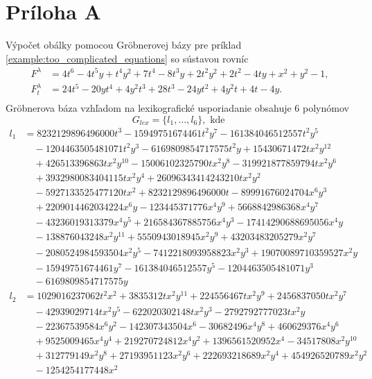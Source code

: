 \chapter{Príloha A}
\label{pri:priloha1}
Výpočet obálky pomocou Gröbnerovej bázy pre príklad \ref{example:too_complicated_equations} so sústavou rovníc
\begin{align*}
F^\lambda &= 4 t^6 - 4 t^5 y + t^4 y^2 + 7 t^4 - 8 t^3 y + 2 t^2 y^2 + 2 t^2 - 4 t y + x^2 + y^2 - 1, \\
F_t^\lambda &= 24t^5-20yt^4+4y^2t^3+28t^3-24yt^2+4y^2t+4t-4y. \\
\end{align*}
Gröbnerova báza vzhľadom na lexikografické usporiadanie obsahuje $6$ polynómov
$$ G_{lex} = \{l_1,\dots, l_6 \}, \text{ kde } $$
\begin{align*}
l_1 &= 8232129896496000t^3 - 15949751674461t^2y^7 - 161384046512557t^2y^5 \\
&\quad - 1204463505481071t^2y^3 - 6169809854717575t^2y + 15430671472tx^2y^{12} \\
&\quad + 426513396863tx^2y^{10} - 15006102325790tx^2y^8 - 319921877859794tx^2y^6 \\
&\quad + 3932980083404115tx^2y^4 + 26096343414243210tx^2y^2 \\
&\quad - 5927133525477120tx^2 + 8232129896496000t - 89991676024704x^6y^3  \\
&\quad + 2209014462034224x^6y - 123445371776x^4y^9 + 5668842986368x^4y^7 \\ 
&\quad - 43236019313379x^4y^5 + 216584367885756x^4y^3 - 17414290688695056x^4y \\
&\quad - 138876043248x^2y^{11} + 5550943018945x^2y^9 + 43203483205279x^2y^7 \\
&\quad - 2080524984593504x^2y^5 - 7412218093958823x^2y^3 + 19070089710359527x^2y \\
&\quad - 15949751674461y^7 - 161384046512557y^5 - 1204463505481071y^3 \\
&\quad - 6169809854717575y \\
l_2 &= 1029016237062t^2x^2 + 3835312tx^2y^{11} + 224556467tx^2y^9 + 2456837050tx^2y^7 \\
&\quad - 42939029714tx^2y^5 - 622020302148tx^2y^3 - 2792792777023tx^2y \\
&\quad - 22367539584x^6y^2 - 142307343504x^6 - 30682496x^4y^8 + 460629376x^4y^6 \\
&\quad + 9525009465x^4y^4 + 219270724812x^4y^2 + 1396561520952x^4 - 34517808x^2y^{10} \\
&\quad + 312779149x^2y^8 + 27193951123x^2y^6 + 222693218689x^2y^4 + 454926520789x^2y^2 \\
&\quad - 1254254177448x^2 \\
\end{align*}
